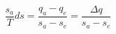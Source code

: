 

\item[b)] \[
    \frac{s_a}{T} ds = \frac{q_a - q_e}{s_a - s_e} = \frac{\Delta q}{s_a - s_e}
    \]